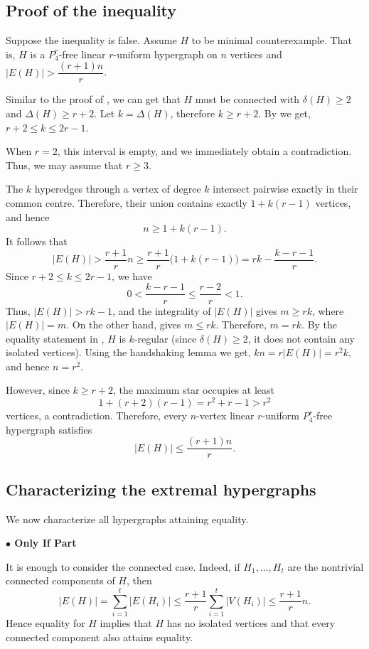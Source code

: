 \documentclass[11pt,a4paper]{article}
\theoremstyle{definition}
\theoremstyle{remark}
\begin{document}
\subsection{Proof of the inequality}

Suppose the inequality is false. Assume $H$ to be minimal counterexample. That is, $H$ is a $P_4^r$-free linear $r$-uniform hypergraph on $n$ vertices and $|E(H)| > \dfrac{(r+1)n}{r}$.

Similar to the proof of , we can get that $H$ must be connected with $\delta(H) \geq 2$ and $\Delta(H) \geq r+2$.
Let $k=\Delta(H)$, therefore
$k\geq r+2.$
By  we get, $r+2\leq k\leq 2r-1.$

When $r=2$, this interval is empty, and we immediately obtain a
contradiction. Thus, we may assume that $r\geq 3$.

The $k$ hyperedges through a vertex of degree $k$ intersect pairwise
exactly in their common centre. Therefore, their union contains
exactly $1+k(r-1)$ vertices, and hence
$$
n\geq 1+k(r-1).
$$
It follows that
$$
|E(H)|
>\frac{r+1}{r}n \geq
\frac{r+1}{r}\bigl(1+k(r-1)\bigr)= rk-\frac{k-r-1}{r}.
$$
Since $r+2\leq k\leq 2r-1$, we have
$$
0<\frac{k-r-1}{r}\leq\frac{r-2}{r}<1.
$$
Thus, $|E(H)|>rk-1$, and the integrality of $|E(H)|$ gives $
m\geq rk$, where $|E(H)| = m$.
On the other hand,  gives $m\leq rk$.
Therefore, $m=rk.$
By the equality statement in , $H$ is
$k$-regular (since $\delta(H) \geq 2$, it does not contain any isolated vertices). Using the handshaking lemma we get,
$kn=r|E(H)|=r^2k,$
and hence $n=r^2.$

However, since $k\geq r+2$, the maximum star occupies at least
$$
1+(r+2)(r-1)=r^2+r-1>r^2
$$
vertices, a contradiction. Therefore, every $n$-vertex linear
$r$-uniform $P_4^r$-free hypergraph satisfies
$$
|E(H)|\leq\frac{(r+1)n}{r}.
$$

\subsection{Characterizing the extremal hypergraphs}

We now characterize all hypergraphs attaining equality. 

\vspace{2mm}

\noindent\textbf{$\bullet$ Only If Part}

\noindent It is enough to consider the connected case. Indeed, if
$H_1,\ldots,H_t$ are the nontrivial connected components of $H$, then
$$
|E(H)|=\sum_{i=1}^t |E(H_i)|
\leq \frac{r+1}{r}\sum_{i=1}^t |V(H_i)|
\leq \frac{r+1}{r}n.
$$
Hence equality for $H$ implies that $H$ has no isolated vertices and
that every connected component also attains equality.
\end{document}
